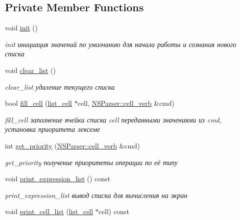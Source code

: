\subsection*{Private Member Functions}
\begin{DoxyCompactItemize}
\item 
void \hyperlink{classRecognizer_aaed9d9a4c9da3c87bead97c2bdff67ee}{init} ()
\begin{DoxyCompactList}\small\item\em init инициация значений по умолчанию для начала работы и сознания нового списка \end{DoxyCompactList}\item 
void \hyperlink{classRecognizer_a26b489b7440f205ebcd2e0ec5ddde7b0}{clear\+\_\+list} ()
\begin{DoxyCompactList}\small\item\em clear\+\_\+list удаление текущего списка \end{DoxyCompactList}\item 
bool \hyperlink{classRecognizer_a537a84cf5e128047ce9940227428e37c}{fill\+\_\+cell} (\hyperlink{structlist__cell}{list\+\_\+cell} $\ast$cell, \hyperlink{structNSParser_1_1cell__verb}{N\+S\+Parser\+::cell\+\_\+verb} \&cmd)
\begin{DoxyCompactList}\small\item\em fill\+\_\+cell заполнение ячейки списка cell переданными значениями из cmd, установка приоритета лексеме \end{DoxyCompactList}\item 
int \hyperlink{classRecognizer_abb82141d2131cc8d2cdbdcbd27e481e2}{get\+\_\+priority} (\hyperlink{structNSParser_1_1cell__verb}{N\+S\+Parser\+::cell\+\_\+verb} \&cmd)
\begin{DoxyCompactList}\small\item\em get\+\_\+priority получение приоритеты операции по её типу \end{DoxyCompactList}\item 
void \hyperlink{classRecognizer_ae769340001160be53c33f440ddea8be7}{print\+\_\+expression\+\_\+list} () const 
\begin{DoxyCompactList}\small\item\em print\+\_\+expression\+\_\+list вывод списка для вычисления на экран \end{DoxyCompactList}\item 
void \hyperlink{classRecognizer_af0e40e5fb733a601751f97568aaeb856}{print\+\_\+cell\+\_\+list} (\hyperlink{structlist__cell}{list\+\_\+cell} $\ast$cell) const 

\end{DoxyCompactItemize}
